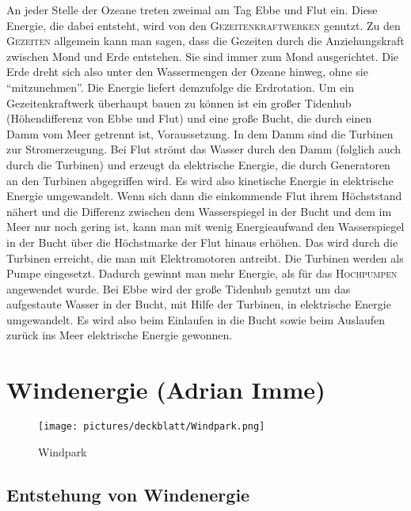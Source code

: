 \documentclass[12pt]{scrbook}
\begin{document}
An jeder Stelle der Ozeane treten zweimal am Tag Ebbe und Flut ein.
Diese Energie, die dabei entsteht, wird von den \textsc{Gezeitenkraftwerken} genutzt.
Zu den \textsc{Gezeiten} allgemein kann man sagen, dass die Gezeiten durch die
Anziehungskraft zwischen Mond und Erde entstehen. Sie sind immer zum Mond
ausgerichtet. Die Erde dreht sich also unter den Wassermengen der Ozeane
hinweg, ohne sie "`mitzunehmen"'.
Die Energie liefert demzufolge die Erdrotation. Um ein Gezeitenkraftwerk
überhaupt bauen zu können ist ein großer Tidenhub (Höhendifferenz von Ebbe und
Flut) und eine große Bucht, die durch einen Damm vom Meer getrennt ist,
Voraussetzung. In dem Damm sind die Turbinen zur Stromerzeugung.
Bei Flut strömt das Wasser durch den Damm (folglich auch durch die Turbinen)
und erzeugt da elektrische Energie, die durch Generatoren an den Turbinen
abgegriffen wird.
Es wird also kinetische Energie in elektrische Energie umgewandelt.
Wenn sich dann die einkommende Flut ihrem Höchststand nähert und die Differenz
zwischen dem Wasserspiegel in der Bucht und dem im Meer nur noch gering ist,
kann man mit wenig Energieaufwand den Wasserspiegel in der Bucht über die
Höchstmarke der Flut hinaus erhöhen.
Das wird durch die Turbinen erreicht, die man mit Elektromotoren antreibt.
Die Turbinen werden als Pumpe eingesetzt. Dadurch gewinnt man mehr Energie,
als für das \textsc{Hochpumpen} angewendet wurde.
Bei Ebbe wird der große Tidenhub genutzt um das aufgestaute Wasser in der
Bucht, mit Hilfe der Turbinen, in elektrische Energie umgewandelt.
Es wird also beim Einlaufen in die Bucht sowie beim Auslaufen zurück ins Meer
elektrische Energie gewonnen.

\newpage

\chapter{Windenergie (Adrian Imme)}

\begin{figure}[htbp] 
  \centering
     \texttt{[image: pictures/deckblatt/Windpark.png]}
  \caption{Windpark}
  \label{pic:Windpark}
\end{figure}

\newpage

\section{Entstehung von Windenergie}
\end{document}
